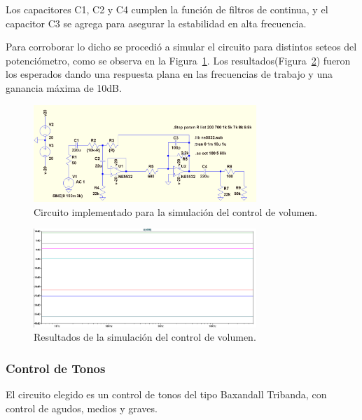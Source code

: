 Los capacitores C1, C2 y C4 cumplen la función de filtros de continua, y el capacitor C3 se agrega para asegurar la estabilidad en alta frecuencia.

Para corroborar lo dicho se procedió a simular el circuito para distintos seteos del potenciómetro, como se observa en la Figura~\ref{ctrl_vol_cir_sim}. Los resultados(Figura~\ref{ctrl_vol_sim}) fueron los esperados dando una respuesta plana en las frecuencias de trabajo y una ganancia máxima de 10dB.

\begin{figure}[H]
\centering
\includegraphics[width=0.75\textwidth]{img/ctrl_vol_cir_sim.png}
\caption{Circuito implementado para la simulación del control de volumen.}
\label{ctrl_vol_cir_sim} 
\end{figure}

\begin{figure}[H]
\centering
\includegraphics[width=0.75\textwidth]{img/cir_vol_sim.png}
\caption{Resultados de la simulación del control de volumen.}
\label{ctrl_vol_sim} 
\end{figure}
\medskip
\subsubsection{Control de Tonos}
\medskip
El circuito elegido es un control de tonos del tipo Baxandall Tribanda,  con control de agudos, medios y graves. 

